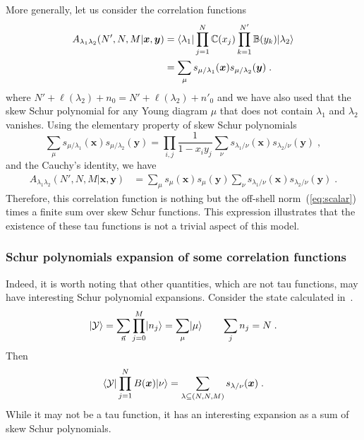 \documentclass[a4paper,11pt]{amsart}
\begin{document}
More generally, let us consider the correlation functions 
\begin{equation}
\begin{split}
  A_{\lambda_1 \lambda_2}(N', N, M|\bm{x}, \bm{y}) & =
  \langle\lambda_1\rvert \prod_{j=1}^N \mathbb{C}(x_j)
  \prod_{k=1}^{N'} \mathbb{B}(y_k)\lvert\lambda_2\rangle \\
  & = \sum_{\mu} s_{\mu/\lambda_1}(\bm{x}) s_{\mu/\lambda_2}(\bm{y}) \; .
\end{split}
\end{equation}
where \(N' + \ell(\lambda_2) + n_0 = N' + \ell(\lambda_2) + n'_0\) and
we have also used that the skew Schur polynomial for any Young diagram
\(\mu\) that does not contain \(\lambda_1\) and \(\lambda_2\)
vanishes. Using the elementary property of skew Schur
polynomials~\cite{Macdonald:1998}
\begin{equation}
  \sum_{\mu} s_{\mu/\lambda_1}(\bm{x}) s_{\mu/\lambda_2}(\bm{y}) = \prod_{i,j}\frac{1}{1 - x_i y_j}
 \sum_\nu s_{\lambda_1/\nu}(\bm{x}) s_{\lambda_2/\nu}(\bm{y})\; ,
\end{equation}
and the Cauchy's identity, we have 
\begin{equation}
\begin{split}
  A_{\lambda_1 \lambda_2}(N', N, M|\bm{x}, \bm{y}) & =
 \sum_\mu s_{\mu}(\bm{x}) s_{\mu}(\bm{y})
 \sum_\nu s_{\lambda_1/\nu}(\bm{x}) s_{\lambda_2/\nu}(\bm{y})\; .
\end{split}
\end{equation}
Therefore, this correlation function is nothing but the off-shell
norm~(\ref{eq:scalar}) times a finite sum over skew Schur
functions. This expression illustrates that the existence of these tau
functions is not a trivial aspect of this model.


\subsubsection{Schur polynomials expansion of some correlation functions}
Indeed, it is worth noting that other quantities, which are not tau
functions, may have interesting Schur polynomial expansions. Consider
the state calculated in~\cite{Bogoliubov2005}.
\begin{equation}
  \lvert\mathcal{Y}\rangle =
 \sum_{\vec{n}} \prod_{j=0}^M \lvert n_j\rangle = \sum_\mu \lvert\mu\rangle \qquad \sum_j n_j = N\; .
\end{equation}
Then
\begin{equation}
 \langle\mathcal{Y}\rvert \prod_{j=1}^N B(\bm{x}) \lvert\nu\rangle = 
  \sum_{\lambda\subseteq (N,N,M)} s_{\lambda/\nu}(\bm{x})\; . 
\end{equation}
While it may not be a tau function, it has an interesting expansion as
a sum of skew Schur polynomials.
\end{document}
